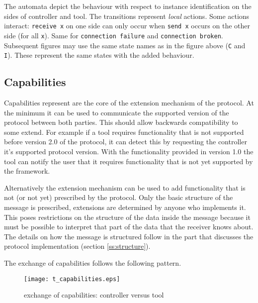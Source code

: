 \documentclass{article}
\begin{document}
   \noindent The automata depict the behaviour with respect to instance
   identification on the sides of controller and tool. The transitions
   represent \emph{local} actions. Some actions interact: \verb'receive x' on
   one side can only occur when \verb'send x' occurs on the other side (for all
   \verb'x'). Same for \verb'connection failure' and \verb'connection broken'.
   Subsequent figures may use the same state names as in the figure above
   (\verb'C' and \verb'I'). These represent the same states with the added
   behaviour.

  \subsection{Capabilities}

   Capabilities represent are the core of the extension mechanism of the
   protocol. At the minimum it can be used to communicate the supported version
   of the protocol between both parties. This should allow backwards
   compatibility to some extend. For example if a tool requires functionality
   that is not supported before version 2.0 of the protocol, it can detect this
   by requesting the controller it's supported protocol version. With the
   functionality provided in version 1.0 the tool can notify the user that it
   requires functionality that is not yet supported by the framework.

   Alternatively the extension mechanism can be used to add functionality that
   is not (or not yet) prescribed by the protocol. Only the basic structure of
   the message is prescribed, extensions are determined by anyone who
   implements it. This poses restrictions on the structure of the data inside
   the message because it must be possible to interpret that part of the data
   that the receiver knows about. The details on how the message is structured
   follow in the part that discusses the protocol implementation (section
   \ref{ss:structure}).

   The exchange of capabilities follows the following pattern.
   
   \begin{figure}[H]
    \begin{center}
     \texttt{[image: t\_capabilities.eps]}
    \end{center}
    \vspace{-0.3cm}
    \caption{exchange of capabilities: controller versus tool}
   \end{figure}
\end{document}
